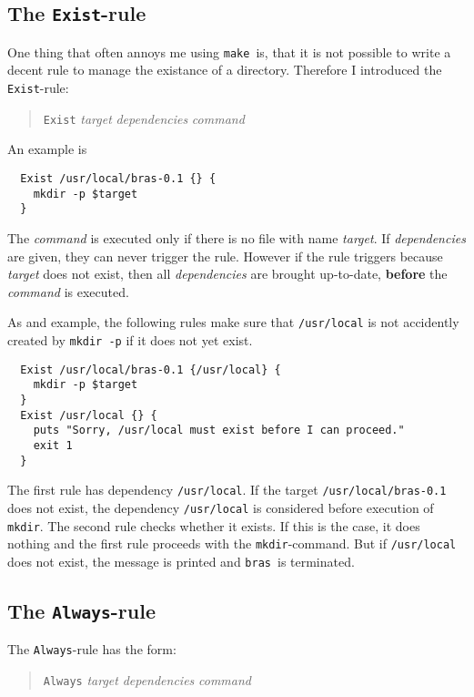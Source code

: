 \documentclass[12pt]{article}
\newcommand{\bras}{\texttt{bras}}
\newcommand{\make}{\texttt{make}}
\begin{document}
\subsection{The \texttt{Exist}-rule}

One thing that often annoys me using \make\ is, that it is not
possible to write a decent rule to manage the existance of a
directory. Therefore I introduced the \texttt{Exist}-rule:
\begin{quote}
  \texttt{Exist} \textit{target} \textit{dependencies} \textit{command}
\end{quote}
An example is
\begin{verbatim}
  Exist /usr/local/bras-0.1 {} {
    mkdir -p $target
  }
\end{verbatim}
The \textit{command} is executed only if there is no file with name
\textit{target}. If \textit{dependencies} are given, they can never
trigger the rule. However if the rule triggers because \textit{target}
does not exist, then all \textit{dependencies} are brought up-to-date,
\textbf{before} the \textit{command} is executed.

As and example, the following rules make sure that
\texttt{/usr/local} is not accidently created by \texttt{mkdir -p} if
it does not yet exist.

\begin{verbatim}
  Exist /usr/local/bras-0.1 {/usr/local} {
    mkdir -p $target
  }
  Exist /usr/local {} {
    puts "Sorry, /usr/local must exist before I can proceed."
    exit 1
  }	
\end{verbatim}
The first rule has dependency \texttt{/usr/local}. If the target
\texttt{/usr/local/bras-0.1}
does not exist, the dependency \texttt{/usr/local} is considered
before execution of \texttt{mkdir}. The second rule checks whether it
exists. If this is the case, it does nothing and the first rule
proceeds with the \texttt{mkdir}-command. But if
\texttt{/usr/local} does not exist, the message is printed and \bras\
is terminated.

\subsection{The \texttt{Always}-rule}

The \texttt{Always}-rule has the form:

\begin{quote}
  \texttt{Always} \textit{target} \textit{dependencies} \textit{command}
\end{quote}
\end{document}
